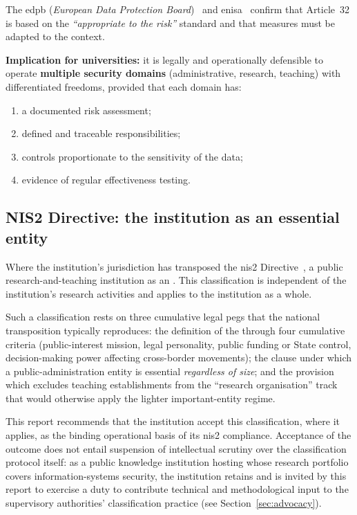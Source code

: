 The \gls{edpb} (\emph{European Data Protection Board})~\cite{edpb-guidelines}
and \gls{enisa}~\cite{enisa-risk} confirm that Article~32 is based on the
\emph{``appropriate to the risk''} standard and that measures must be
adapted to the context.

\textbf{Implication for universities:} it is legally and
operationally defensible to operate \textbf{multiple security
domains} (administrative, research, teaching) with differentiated
freedoms, provided that each domain has:
\begin{enumerate}[nosep]
    \item a documented risk assessment;
    \item defined and traceable responsibilities;
    \item controls proportionate to the sensitivity of the data;
    \item evidence of regular effectiveness testing.
\end{enumerate}

\subsection{NIS2 Directive: the institution as an essential entity}
\label{sec:nis2}

Where the institution's jurisdiction has transposed the \gls{nis2}
Directive~\cite{nis2}, a public research-and-teaching institution 
as an . This classification is
independent of the institution's research activities and applies to the
institution as a whole.

Such a classification rests on three cumulative legal pegs that the
national transposition typically reproduces:
the definition of the 
through four cumulative criteria (public-interest mission, legal
personality, public funding or State control, decision-making power
affecting cross-border movements); the clause under which a
public-administration entity is essential \emph{regardless of size};
and the provision which excludes teaching establishments
from the ``research organisation'' track that would otherwise apply
the lighter important-entity regime.

This report recommends that the institution accept this classification,
where it applies, as the binding operational basis of its \gls{nis2}
compliance. Acceptance of the outcome does not entail suspension of
intellectual scrutiny over the classification protocol itself: as a
public knowledge institution hosting  whose
research portfolio covers information-systems security, the institution
retains and is invited by this report to exercise a duty to contribute
technical and methodological input to the supervisory authorities'
classification practice (see Section~\ref{sec:advocacy}).

